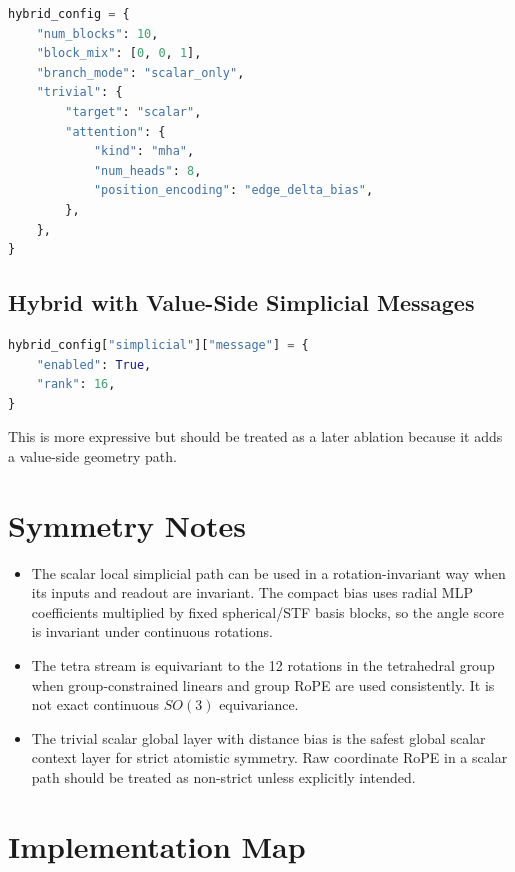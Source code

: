 \documentclass[11pt]{article}
\begin{document}
\begin{lstlisting}[language=Python]
hybrid_config = {
    "num_blocks": 10,
    "block_mix": [0, 0, 1],
    "branch_mode": "scalar_only",
    "trivial": {
        "target": "scalar",
        "attention": {
            "kind": "mha",
            "num_heads": 8,
            "position_encoding": "edge_delta_bias",
        },
    },
}
\end{lstlisting}

\subsection{Hybrid with Value-Side Simplicial Messages}

\begin{lstlisting}[language=Python]
hybrid_config["simplicial"]["message"] = {
    "enabled": True,
    "rank": 16,
}
\end{lstlisting}

This is more expressive but should be treated as a later ablation because it
adds a value-side geometry path.

\section{Symmetry Notes}

\begin{itemize}[leftmargin=1.5em]
  \item The scalar local simplicial path can be used in a rotation-invariant way
  when its inputs and readout are invariant.  The compact bias uses radial MLP
  coefficients multiplied by fixed spherical/STF basis blocks, so the angle
  score is invariant under continuous rotations.

  \item The tetra stream is equivariant to the 12 rotations in the tetrahedral
  group when group-constrained linears and group RoPE are used consistently.
  It is not exact continuous \(SO(3)\) equivariance.

  \item The trivial scalar global layer with distance bias is the safest global
  scalar context layer for strict atomistic symmetry.  Raw coordinate RoPE in a
  scalar path should be treated as non-strict unless explicitly intended.
\end{itemize}

\section{Implementation Map}
\end{document}
